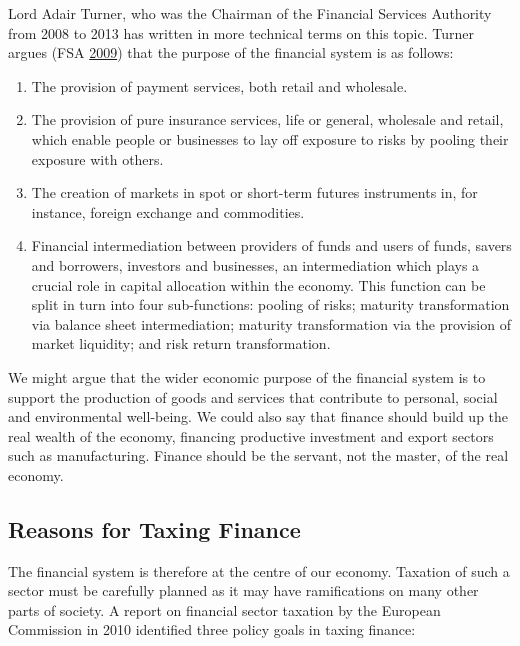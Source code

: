 \documentclass[]{tufte-handout}
\providecommand{\tightlist}{%
  \setlength{\itemsep}{0pt}\setlength{\parskip}{0pt}}
\begin{document}
Lord Adair Turner, who was the Chairman of the Financial Services
Authority from 2008 to 2013 has written in more technical terms on this
topic. Turner argues (FSA \protect\hyperlink{ref-FSA2009}{2009}) that
the purpose of the financial system is as follows:

\begin{enumerate}
\def\labelenumi{\arabic{enumi}.}
\tightlist
\item
  The provision of payment services, both retail and wholesale.
\item
  The provision of pure insurance services, life or general, wholesale
  and retail, which enable people or businesses to lay off exposure to
  risks by pooling their exposure with others.
\item
  The creation of markets in spot or short-term futures instruments in,
  for instance, foreign exchange and commodities.
\item
  Financial intermediation between providers of funds and users of
  funds, savers and borrowers, investors and businesses, an
  intermediation which plays a crucial role in capital allocation within
  the economy. This function can be split in turn into four
  sub-functions: pooling of risks; maturity transformation via balance
  sheet intermediation; maturity transformation via the provision of
  market liquidity; and risk return transformation.
\end{enumerate}

We might argue that the wider economic purpose of the financial system
is to support the production of goods and services that contribute to
personal, social and environmental well-being. We could also say that
finance should build up the real wealth of the economy, financing
productive investment and export sectors such as manufacturing. Finance
should be the servant, not the master, of the real economy.

\hypertarget{reasons-for-taxing-finance}{%
\subsection{Reasons for Taxing
Finance}\label{reasons-for-taxing-finance}}

The financial system is therefore at the centre of our economy. Taxation
of such a sector must be carefully planned as it may have ramifications
on many other parts of society. A report on financial sector taxation by
the European Commission in 2010 identified three policy goals in taxing
finance:
\end{document}
